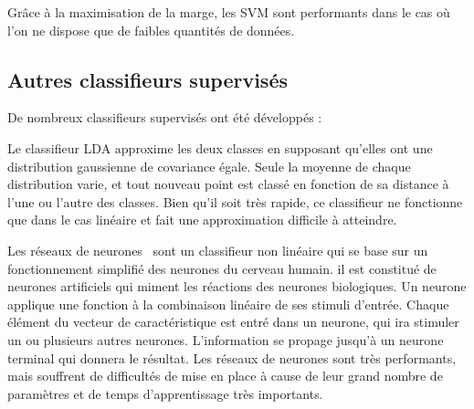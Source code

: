 Grâce à la maximisation de la marge, les SVM sont performants dans le cas où l'on ne dispose que de faibles quantités de données.

\subsection{Autres classifieurs supervisés}

De nombreux classifieurs supervisés ont été développés :

Le classifieur LDA\cite{fisher1936use} approxime les deux classes en supposant qu'elles ont une distribution gaussienne de covariance égale. Seule la moyenne de chaque distribution varie, et tout nouveau point est classé en fonction de sa distance à l'une ou l'autre des classes. Bien qu'il soit très rapide, ce classifieur ne fonctionne que dans le cas linéaire et fait une approximation difficile à atteindre. 

Les réseaux de neurones~\cite{haykin1999neural} sont un classifieur non linéaire qui se base sur un fonctionnement simplifié des neurones du cerveau humain. il est constitué de neurones artificiels qui miment les réactions des neurones biologiques. Un neurone applique une fonction à la combinaison linéaire de ses stimuli d'entrée. Chaque élément du vecteur de caractéristique est entré dans un neurone, qui ira stimuler un ou plusieurs autres neurones. L'information se propage jusqu'à un neurone terminal qui donnera le résultat. Les réseaux de neurones sont très performants, mais souffrent de difficultés de mise en place à cause de leur grand nombre de paramètres et de temps d'apprentissage très importants.

